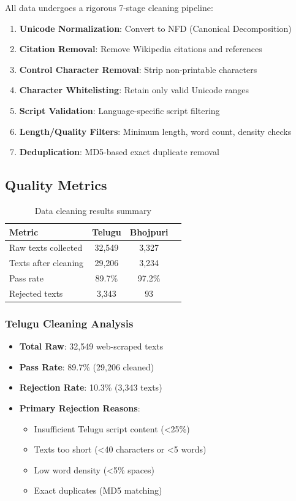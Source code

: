 \documentclass[11pt,a4paper]{article}
\begin{document}
All data undergoes a rigorous 7-stage cleaning pipeline:

\begin{enumerate}
    \item \textbf{Unicode Normalization}: Convert to NFD (Canonical Decomposition)
    \item \textbf{Citation Removal}: Remove Wikipedia citations and references
    \item \textbf{Control Character Removal}: Strip non-printable characters
    \item \textbf{Character Whitelisting}: Retain only valid Unicode ranges
    \item \textbf{Script Validation}: Language-specific script filtering
    \item \textbf{Length/Quality Filters}: Minimum length, word count, density checks
    \item \textbf{Deduplication}: MD5-based exact duplicate removal
\end{enumerate}

\subsection{Quality Metrics}

\begin{table}[H]
    \centering
    \begin{tabular}{|l|c|c|c|}
    \hline
    \textbf{Metric} & \textbf{Telugu} & \textbf{Bhojpuri} \\
    \hline
    Raw texts collected & 32,549 & 3,327 \\
    Texts after cleaning & 29,206 & 3,234 \\
    Pass rate & 89.7\% & 97.2\% \\
    Rejected texts & 3,343 & 93 \\
    \hline
    \end{tabular}
    \caption{Data cleaning results summary}
    \label{tab:cleaning}
\end{table}

\subsubsection{Telugu Cleaning Analysis}

\begin{itemize}
    \item \textbf{Total Raw}: 32,549 web-scraped texts
    \item \textbf{Pass Rate}: 89.7\% (29,206 cleaned)
    \item \textbf{Rejection Rate}: 10.3\% (3,343 texts)
    \item \textbf{Primary Rejection Reasons}:
    \begin{itemize}
        \item Insufficient Telugu script content (<25\%)
        \item Texts too short (<40 characters or <5 words)
        \item Low word density (<5\% spaces)
        \item Exact duplicates (MD5 matching)
    \end{itemize}
\end{itemize}
\end{document}
